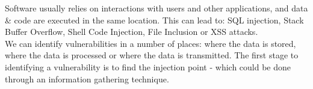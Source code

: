 Software usually relies on interactions with users and other applications, and data \& code are executed in the same location. This can lead to: SQL injection, Stack Buffer Overflow, Shell Code Injection, File Inclusion or XSS attacks.\\

We can identify vulnerabilities in a number of places: where the data is stored, where the data is processed or where the data is transmitted. The first stage to identifying a vulnerability is to find the injection point - which could be done through an information gathering technique.
